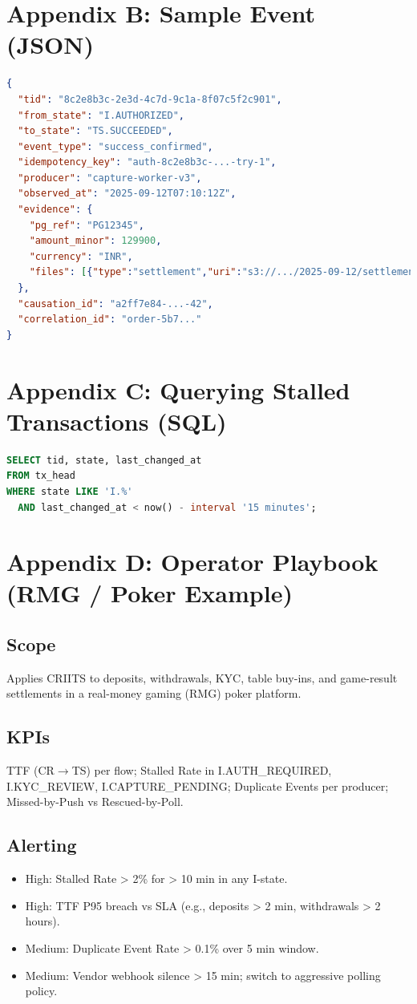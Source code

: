 \documentclass[11pt]{article}
\begin{document}
\section{Appendix B: Sample Event (JSON)}
\begin{lstlisting}[language=json]
{
  "tid": "8c2e8b3c-2e3d-4c7d-9c1a-8f07c5f2c901",
  "from_state": "I.AUTHORIZED",
  "to_state": "TS.SUCCEEDED",
  "event_type": "success_confirmed",
  "idempotency_key": "auth-8c2e8b3c-...-try-1",
  "producer": "capture-worker-v3",
  "observed_at": "2025-09-12T07:10:12Z",
  "evidence": {
    "pg_ref": "PG12345",
    "amount_minor": 129900,
    "currency": "INR",
    "files": [{"type":"settlement","uri":"s3://.../2025-09-12/settlement.csv"}]
  },
  "causation_id": "a2ff7e84-...-42",
  "correlation_id": "order-5b7..."
}
\end{lstlisting}

\section{Appendix C: Querying Stalled Transactions (SQL)}
\begin{lstlisting}[language=SQL]
SELECT tid, state, last_changed_at
FROM tx_head
WHERE state LIKE 'I.%'
  AND last_changed_at < now() - interval '15 minutes';
\end{lstlisting}

\section{Appendix D: Operator Playbook (RMG / Poker Example)}
\subsection*{Scope}
Applies CRIITS to deposits, withdrawals, KYC, table buy-ins, and game-result settlements in a real-money gaming (RMG) poker platform.

\subsection*{KPIs}
TTF (CR$\to$TS) per flow; Stalled Rate in I.AUTH\_REQUIRED, I.KYC\_REVIEW, I.CAPTURE\_PENDING; Duplicate Events per producer; Missed-by-Push vs Rescued-by-Poll.

\subsection*{Alerting}
\begin{itemize}[leftmargin=*]
\item High: Stalled Rate > 2\% for > 10 min in any I-state.
\item High: TTF P95 breach vs SLA (e.g., deposits > 2 min, withdrawals > 2 hours).
\item Medium: Duplicate Event Rate > 0.1\% over 5 min window.
\item Medium: Vendor webhook silence > 15 min; switch to aggressive polling policy.
\end{itemize}
\end{document}
